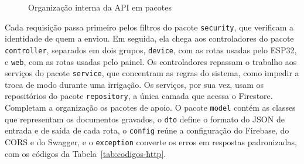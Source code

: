 \begin{figure}[!htbp]
  \centering
  \caption{Organização interna da API em pacotes}
  \label{fig:camadas-api}
\end{figure}

Cada requisição passa primeiro pelos filtros do pacote \texttt{security}, que verificam a identidade de quem a enviou. Em seguida, ela chega aos controladores do pacote \texttt{controller}, separados em dois grupos, \texttt{device}, com as rotas usadas pelo ESP32, e \texttt{web}, com as rotas usadas pelo painel. Os controladores repassam o trabalho aos serviços do pacote \texttt{service}, que concentram as regras do sistema, como impedir a troca de modo durante uma irrigação. Os serviços, por sua vez, usam os repositórios do pacote \texttt{repository}, a única camada que acessa o Firestore. Completam a organização os pacotes de apoio. O pacote \texttt{model} contém as classes que representam os documentos gravados, o \texttt{dto} define o formato do JSON de entrada e de saída de cada rota, o \texttt{config} reúne a configuração do Firebase, do CORS e do Swagger, e o \texttt{exception} converte os erros em respostas padronizadas, com os códigos da Tabela~\ref{tab:codigos-http}.

